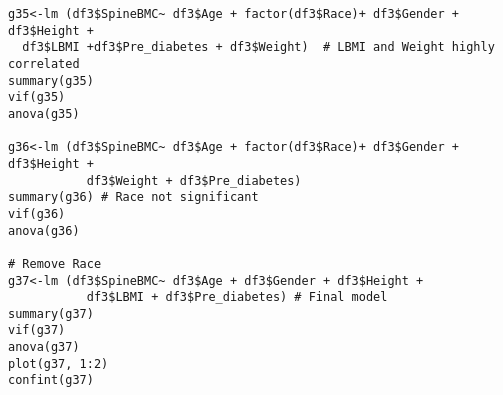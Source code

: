 \documentclass[11pt]{article}
\begin{document}
\begin{verbatim}
g35<-lm (df3$SpineBMC~ df3$Age + factor(df3$Race)+ df3$Gender + df3$Height + 
  df3$LBMI +df3$Pre_diabetes + df3$Weight)  # LBMI and Weight highly correlated
summary(g35)    
vif(g35) 
anova(g35)

g36<-lm (df3$SpineBMC~ df3$Age + factor(df3$Race)+ df3$Gender + df3$Height + 
           df3$Weight + df3$Pre_diabetes)  
summary(g36) # Race not significant
vif(g36) 
anova(g36)

# Remove Race
g37<-lm (df3$SpineBMC~ df3$Age + df3$Gender + df3$Height + 
           df3$LBMI + df3$Pre_diabetes) # Final model
summary(g37)
vif(g37) 
anova(g37)
plot(g37, 1:2)
confint(g37)
\end{verbatim}
\fi
\end{document}
